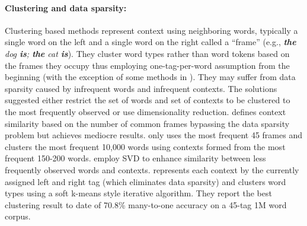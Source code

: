 \paragraph{Clustering and data sparsity:}
Clustering based methods represent context using neighboring words,
typically a single word on the left and a single word on the right
called a ``frame'' (e.g., {\em {\bf the} dog {\bf is}; {\bf the} cat
  {\bf is}}).  They cluster word types rather than word tokens based
on the frames they occupy thus employing one-tag-per-word assumption
from the beginning (with the exception of some methods in
\cite{Schutze:1995:DPT:976973.976994}).  They may suffer from data
sparsity caused by infrequent words and infrequent contexts.  The
solutions suggested either restrict the set of words and set of
contexts to be clustered to the most frequently observed or use
dimensionality reduction.  \cite{redington1998distributional} defines
context similarity based on the number of common frames bypassing the
data sparsity problem but achieves mediocre results.
\cite{mintz2003frequent} only uses the most frequent 45 frames and
\cite{biemann2006unsupervised} clusters the most frequent 10,000 words
using contexts formed from the most frequent 150-200 words.
\cite{Schutze:1995:DPT:976973.976994,lamar-EtAl:2010:Short} employ SVD
to enhance similarity between less frequently observed words and
contexts.  \cite{Lamar:2010:LCU:1870658.1870736} represents each
context by the currently assigned left and right tag (which eliminates
data sparsity) and clusters word types using a soft k-means style
iterative algorithm.  They report the best clustering result to date
of 70.8\% many-to-one accuracy on a 45-tag 1M word corpus.


